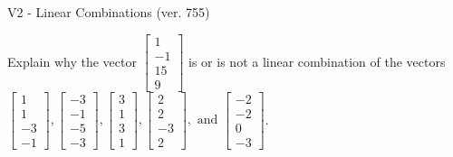 \begin{exercise}
  \begin{exerciseTitle}V2 - Linear Combinations (ver. 755)\end{exerciseTitle}
  \begin{exerciseStatement}
    Explain why the vector \(\left[\begin{array}{c}
1 \\
-1 \\
15 \\
9
\end{array}\right]\)  is or is not a linear 
	combination of the vectors \(\left[\begin{array}{c}
1 \\
1 \\
-3 \\
-1
\end{array}\right] , \left[\begin{array}{c}
-3 \\
-1 \\
-5 \\
-3
\end{array}\right] , \left[\begin{array}{c}
3 \\
1 \\
3 \\
1
\end{array}\right] , \left[\begin{array}{c}
2 \\
2 \\
-3 \\
2
\end{array}\right] , \text{ and } \left[\begin{array}{c}
-2 \\
-2 \\
0 \\
-3
\end{array}\right]\).
	



\end{exerciseStatement}
\end{exercise}
